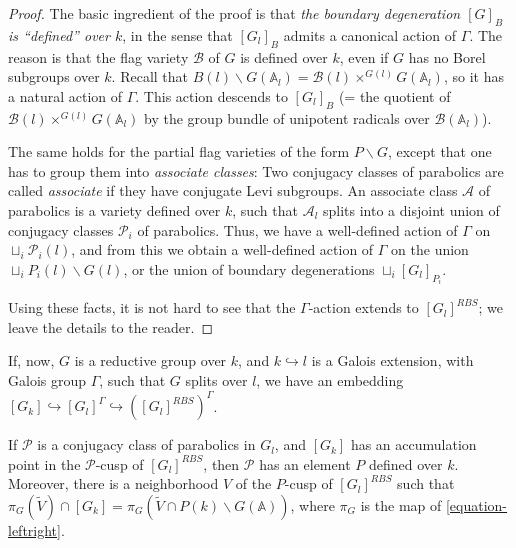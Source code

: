 \begin{proof}
 The basic ingredient of the proof is that \emph{the boundary degeneration $[G]_B$ is ``defined'' over $k$}, in the sense that $[G_l]_B$ admits a canonical action of $\Gamma$. The reason is that the flag variety $\mathcal B$ of $G$ is defined over $k$, even if $G$ has no Borel subgroups over $k$. Recall that $B(l)\backslash G(\mathbb A_l) = \mathcal B(l)\times^{G(l)}G(\mathbb A_l)$, so it has a natural action of $\Gamma$. This action descends to $[G_l]_B$ (= the quotient of $\mathcal B(l)\times^{G(l)}G(\mathbb A_l)$ by the group bundle of unipotent radicals over $\mathcal B(\mathbb A_l)$).
 
 The same holds for the partial flag varieties of the form $P\backslash G$, except that one has to group them into \emph{associate classes}: Two conjugacy classes of parabolics are called \emph{associate} if they have conjugate Levi subgroups. An associate class $\mathcal A$ of parabolics is a variety defined over $k$, such that $\mathcal A_l$ splits into a disjoint union of conjugacy classes $\mathcal P_i$ of parabolics. Thus, we have a well-defined action of $\Gamma$ on $\sqcup_i \mathcal P_i(l)$, and from this we obtain a well-defined action of $\Gamma$ on the union $\sqcup_i P_i(l)\backslash G(l)$, or the union of boundary degenerations $\sqcup_i [G_l]_{P_i}$. 
 
 Using these facts, it is not hard to see that the $\Gamma$-action extends to $[G_l]^{RBS}$; we leave the details to the reader.
\end{proof}


If, now, $G$ is a reductive group over $k$, and $k\hookrightarrow l$ is a Galois extension, with Galois group $\Gamma$, such that $G$ splits over $l$, we have an embedding $[G_k]\hookrightarrow [G_l]^\Gamma\hookrightarrow ([G_l]^{RBS})^\Gamma$.

\begin{proposition}
 \label{proposition-Gk-in-Gl}
If $\mathcal P$ is a conjugacy class of parabolics in $G_l$, and $[G_k]$ has an accumulation point in the $\mathcal P$-cusp of $[G_l]^{RBS}$, then $\mathcal P$ has an element $P$ defined over $k$. Moreover, there is a neighborhood $V$ of the $P$-cusp of $[G_l]^{RBS}$ such that $\pi_G(\tilde V) \cap [G_k] = \pi_G(\tilde V \cap P(k)\backslash G(\mathbb A))$, where $\pi_G$ is the map of \eqref{equation-leftright}. 
\end{proposition}

